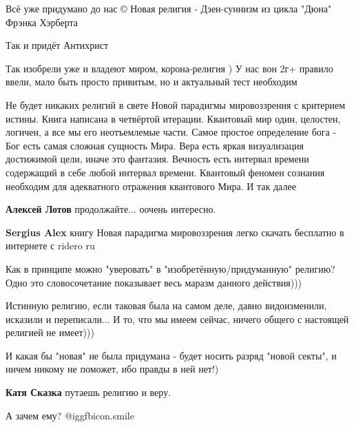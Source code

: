 \begin{itemize}
\begin{itemize}
\end{itemize} %


Всё уже придумано до нас ©
Новая религия - Дзен-суннизм
из цикла "Дюна" Фрэнка Хэрберта

Так и придёт Антихрист


Так изобрели уже и владеют миром, корона-религия ) У нас вон 2г+ правило ввели,
мало быть просто привитым, но и актуальный тест необходим



Не будет никаких религий в свете
Новой парадигмы мировоззрения
с критерием истины. Книга написана в четвёртой итерации.
Квантовый мир один, целостен, логичен, а все мы его неотъемлемые части.
Самое простое определение бога - Бог есть самая сложная сущность Мира.
Вера есть яркая визуализация достижимой цели, иначе это фантазия.
Вечность есть интервал времени содержащий в себе любой интервал времени.
Квантовый феномен сознания необходим для адекватного отражения квантового Мира.
И так далее

\begin{itemize} %
\textbf{Алексей Лотов} продолжайте... оочень интересно.

\textbf{Sergius Alex} книгу
Новая парадигма мировоззрения
легко скачать бесплатно в интернете с ridero ru
\end{itemize} %


Как в принципе можно "уверовать" в "изобретённую/придуманную" религию?🤦 Одно
это словосочетание показывает весь маразм данного действия)))

Истинную религию, если таковая была на самом деле, давно видоизменили, исказили
и переписали... И то, что мы имеем сейчас, ничего общего с настоящей религией
не имеет)))

И какая бы "новая" не была придумана - будет носить разряд "новой секты", и
ничем никому не поможет, ибо правды в ней нет!)

\begin{itemize} %
\textbf{Катя Сказка} путаешь религию и веру.
\end{itemize} %

А зачем ему?  @igg{fbicon.smile} 



\end{itemize}
